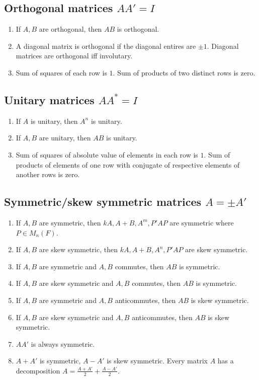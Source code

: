 \subsection{Orthogonal matrices $AA'=I$}
\begin{enumerate}
	\item If $A,B$ are orthogonal, then $AB$ is orthogonal.
	\item A diagonal matrix is orthogonal if the diagonal entires are $\pm 1$.
		\subitem Diagonal matrices are orthogonal iff involutary.
	\item Sum of squares of each row is $1$. Sum of products of two distinct rows is zero.
\end{enumerate}

\subsection{Unitary matrices $AA^\ast=I$}
\begin{enumerate}
	\item If $A$ is unitary, then $A^n$ is unitary.
	\item If $A,B$ are unitary, then $AB$ is unitary.
	\item Sum of squares of absolute value of elements in each row is $1$. Sum of products of elements of one row with conjugate of respective elements of another rows is zero.
\end{enumerate}

\subsection{Symmetric/skew symmetric matrices $A=\pm A'$}
\begin{enumerate}
	\item If $A,B$ are symmetric, then $kA,A+B,A^m,P'AP$ are symmetric where $P \in M_n(F)$.
	\item If $A,B$ are skew symmetric, then $kA,A+B,A^n,P'AP$ are skew symmetric.
	\item If $A,B$ are symmetric and $A,B$ commutes, then $AB$ is symmetric.
	\item If $A,B$ are skew symmetric and $A,B$ commutes, then $AB$ is symmetric.
	\item If $A,B$ are symmetric and $A,B$ anticommutes, then $AB$ is skew symmetric.
	\item If $A,B$ are skew symmetric and $A,B$ anticommutes, then $AB$ is skew symmetric.
	\item $AA'$ is always symmetric.
	\item $A+A'$ is symmetric, $A-A'$ is skew symmetric.
		\subitem Every matrix $A$ has a decomposition $A = \frac{A+A'}{2} + \frac{A-A'}{2}$.
\end{enumerate}

